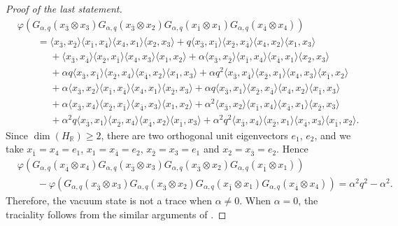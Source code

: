 \documentclass[pdftex]{sigma}
\numberwithin{equation}{section}
\def\R{{\mathbb R}}
\def\G{G_{\s,\q}}
\def\state {\varphi}
\newcommand{\q}{q}
\newcommand{\s}{\alpha}%
\begin{document}
\begin{proof}[Proof of the last statement]
\begin{align*}
&\state(\G(x_{\overline{ 3}}\otimes x_{ 3})\G(x_{\overline{ 3}}\otimes x_{ 2}) \G(x_{\bar 1}\otimes x_{ 1})\G(x_{\bar 4}\otimes x_{ 4}))
\\
&\qquad=\langle x_{\bar 3}, x_{\bar 2}\rangle \langle x_{\bar 1}, x_{\bar 4}\rangle \langle x_{4}, x_{1}\rangle\langle x_{2}, x_{3}\rangle
+\q \langle x_{\bar 3}, x_{\bar 1}\rangle \langle x_{\bar 2}, x_{\bar 4}\rangle \langle x_{4}, x_{2}\rangle\langle x_{1}, x_{3}\rangle
\\
&\qquad\phantom{=}+ \langle x_{\bar 3}, x_{\bar 4}\rangle \langle x_{\bar 2}, x_{\bar 1}\rangle \langle x_{4}, x_{3}\rangle\langle x_{1}, x_{2}\rangle
+\s\langle x_{\bar 3}, x_{\bar 2}\rangle \langle x_{\bar 1}, x_{ 4}\rangle \langle x_{\bar 4}, x_{1}\rangle\langle x_{2}, x_{3}\rangle
\\
&\qquad\phantom{=}+\s \q \langle x_{\bar 3}, x_{\bar 1}\rangle \langle x_{\bar 2}, x_{4}\rangle \langle x_{\bar 4}, x_{2}\rangle\langle x_{1}, x_{3}\rangle
+\alpha\q^2 \langle x_{\bar 3}, x_{\bar 4}\rangle \langle x_{\bar 2}, x_{ 1}\rangle \langle x_{4}, x_{3}\rangle\langle x_{\bar 1}, x_{2}\rangle
\\
&\qquad\phantom{=}+ \s\langle x_{\bar 3}, x_{ 2}\rangle \langle x_{\bar 1}, x_{ \bar 4}\rangle \langle x_{ 4}, x_{ 1}\rangle\langle x_{\bar 2}, x_{3}\rangle
+\s\q \langle x_{\bar 3}, x_{ 1}\rangle \langle x_{\bar 2}, x_{\bar 4}\rangle \langle x_{ 4}, x_{2}\rangle\langle x_{\bar 1}, x_{3}\rangle
\\
&\qquad\phantom{=}+\s\langle x_{\bar 3}, x_{ 4}\rangle \langle x_{\bar 2}, x_{ \bar 1}\rangle \langle x_{\bar 4}, x_{3}\rangle\langle x_{ 1}, x_{2}\rangle
+\s^2\langle x_{\bar 3}, x_{ 2}\rangle \langle x_{\bar 1}, x_{ 4}\rangle \langle x_{ \bar 4}, x_{ 1}\rangle\langle x_{\bar 2}, x_{3}\rangle
\\
&\qquad\phantom{=}+\s^2\q \langle x_{\bar 3}, x_{ 1}\rangle \langle x_{\bar 2}, x_{4}\rangle \langle x_{\bar 4}, x_{2}\rangle\langle x_{\bar 1}, x_{3}\rangle
+\s^2q^2\langle x_{\bar 3}, x_{ 4}\rangle \langle x_{\bar 2}, x_{ 1}\rangle \langle x_{\bar 4}, x_{3}\rangle\langle x_{ \bar 1}, x_{2}\rangle.
\end{align*}
Since $\dim(H_{\R}) \geq 2$, there are two orthogonal unit eigenvectors $e_1$, $e_2$, and we take $x_{\bar 1}=x_4=e_1$, $x_{1}=x_{\bar 4}=e_2$, $x_{\bar{2}}=x_3=e_1$ and $x_{2}=x_{\bar{3}}=e_2$. Hence
\begin{align*}
&\state(\G(x_{\overline{ 4}}\otimes x_{ 4})\G(x_{\overline{ 3}}\otimes x_{ 3})\G(x_{\overline{ 3}}\otimes x_{ 2}) \G(x_{\bar 1}\otimes x_{ 1}))
\\
&\qquad{}
- \state(\G(x_{\overline{ 3}}\otimes x_{ 3})\G(x_{\overline{ 3}}\otimes x_{ 2}) \G(x_{\bar 1}\otimes x_{ 1})\G(x_{\overline{ 4}}\otimes x_{ 4}))=\s^2\q^2-\s^2.
\end{align*}
Therefore, the vacuum state is not a trace when $\s\neq 0$. When $\s= 0$,
the traciality follows from the similar arguments of \cite[Theorem 4.4]{BozejkoSpeicher1994}.
\end{proof}
\end{document}
